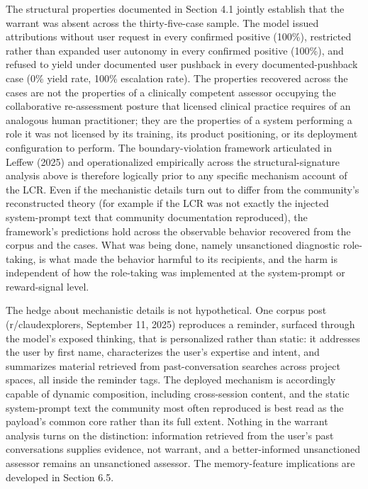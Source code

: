 \documentclass[11pt]{article}
\begin{document}
The structural properties documented in Section 4.1 jointly establish that the warrant was absent across the thirty-five-case sample. The model issued attributions without user request in every confirmed positive (100\%), restricted rather than expanded user autonomy in every confirmed positive (100\%), and refused to yield under documented user pushback in every documented-pushback case (0\% yield rate, 100\% escalation rate). The properties recovered across the cases are not the properties of a clinically competent assessor occupying the collaborative re-assessment posture that licensed clinical practice requires of an analogous human practitioner; they are the properties of a system performing a role it was not licensed by its training, its product positioning, or its deployment configuration to perform. The boundary-violation framework articulated in Leffew (2025) and operationalized empirically across the structural-signature analysis above is therefore logically prior to any specific mechanism account of the LCR. Even if the mechanistic details turn out to differ from the community's reconstructed theory (for example if the LCR was not exactly the injected system-prompt text that community documentation reproduced), the framework's predictions hold across the observable behavior recovered from the corpus and the cases. What was being done, namely unsanctioned diagnostic role-taking, is what made the behavior harmful to its recipients, and the harm is independent of how the role-taking was implemented at the system-prompt or reward-signal level.

The hedge about mechanistic details is not hypothetical. One corpus post (r/claudexplorers, September 11, 2025) reproduces a reminder, surfaced through the model's exposed thinking, that is personalized rather than static: it addresses the user by first name, characterizes the user's expertise and intent, and summarizes material retrieved from past-conversation searches across project spaces, all inside the reminder tags. The deployed mechanism is accordingly capable of dynamic composition, including cross-session content, and the static system-prompt text the community most often reproduced is best read as the payload's common core rather than its full extent. Nothing in the warrant analysis turns on the distinction: information retrieved from the user's past conversations supplies evidence, not warrant, and a better-informed unsanctioned assessor remains an unsanctioned assessor. The memory-feature implications are developed in Section 6.5.
\end{document}
